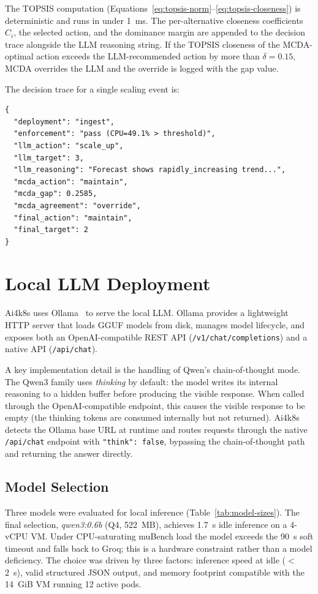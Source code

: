 The TOPSIS computation (Equations~\ref{eq:topsis-norm}--\ref{eq:topsis-closeness})
is deterministic and runs in under 1~ms. The per-alternative closeness coefficients
$C_i$, the selected action, and the dominance margin are appended to the decision
trace alongside the LLM reasoning string. If the TOPSIS closeness of the MCDA-optimal
action exceeds the LLM-recommended action by more than $\delta = 0.15$, MCDA overrides
the LLM and the override is logged with the gap value.

The decision trace for a single scaling event is:
\begin{verbatim}
{
  "deployment": "ingest",
  "enforcement": "pass (CPU=49.1% > threshold)",
  "llm_action": "scale_up",
  "llm_target": 3,
  "llm_reasoning": "Forecast shows rapidly_increasing trend...",
  "mcda_action": "maintain",
  "mcda_gap": 0.2585,
  "mcda_agreement": "override",
  "final_action": "maintain",
  "final_target": 2
}
\end{verbatim}

\section{Local LLM Deployment}
\label{sec:local-llm}

Ai4k8s uses Ollama~\cite{ollama2023} to serve the local LLM. Ollama provides a
lightweight HTTP server that loads GGUF models from disk, manages model lifecycle,
and exposes both an OpenAI-compatible REST API (\texttt{/v1/chat/completions})
and a native API (\texttt{/api/chat}).

A key implementation detail is the handling of Qwen's chain-of-thought mode.
The Qwen3 family uses \textit{thinking} by default: the model writes its internal
reasoning to a hidden buffer before producing the visible response. When called
through the OpenAI-compatible endpoint, this causes the visible response to be
empty (the thinking tokens are consumed internally but not returned). Ai4k8s
detects the Ollama base URL at runtime and routes requests through the native
\texttt{/api/chat} endpoint with \texttt{"think": false}, bypassing the
chain-of-thought path and returning the answer directly.

\subsection{Model Selection}
\label{sec:model-selection}

Three models were evaluated for local inference (Table~\ref{tab:model-sizes}).
The final selection, \textit{qwen3:0.6b} (Q4, 522~MB), achieves 1.7~s idle
inference on a 4-vCPU VM. Under CPU-saturating muBench load the model exceeds
the 90~s soft timeout and falls back to Groq; this is a hardware constraint
rather than a model deficiency. The choice was driven by three factors:
inference speed at idle ($<$2~s), valid structured JSON output, and memory
footprint compatible with the 14~GiB VM running 12 active pods.

